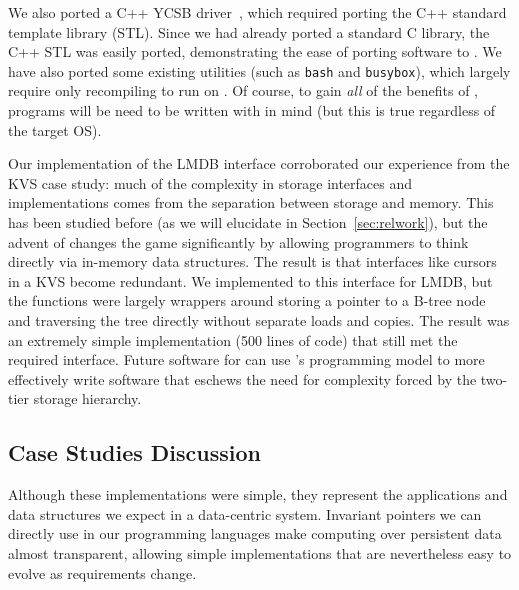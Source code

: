 We also ported a C++ YCSB driver~\cite{ycsbc}, which required porting the C++ standard template
library (STL). Since we had already ported a standard C library, the C++ STL was easily ported,
demonstrating the ease of porting software to \Twizzler.
We have also ported some existing \unix utilities (such as \texttt{bash} and
\texttt{busybox}), which largely require only recompiling to run on \Twizzler. Of
course, to gain \emph{all} of the benefits of \Twizzler, programs will be need to be
written with \NVM in mind (but this is true regardless of the target OS).

Our implementation of the LMDB interface
corroborated our experience from the KVS case study: much of the complexity in storage interfaces
and implementations comes from the separation between storage and memory. This has been
studied before (as we will elucidate in Section~\ref{sec:relwork}), but the advent of \NVM changes the game
significantly by allowing programmers to think directly via in-memory data structures. The result is
that interfaces like cursors in a KVS become redundant. We implemented to this interface
for LMDB, but the functions were largely wrappers around storing a pointer
to a B-tree node and traversing the tree directly without separate loads and copies. The result was
an extremely simple implementation (500 lines of code) that still met the required interface. Future software
for \NVM can use \Twizzler's programming model to more effectively write software
that eschews the need for complexity forced by the two-tier storage hierarchy.



\subsection{Case Studies Discussion}

Although these implementations were simple, they represent the applications
and data structures we expect in a data-centric system. Invariant pointers
we can directly use in our programming languages make computing over persistent
data almost transparent, allowing simple implementations that are nevertheless
easy to evolve as requirements change.

